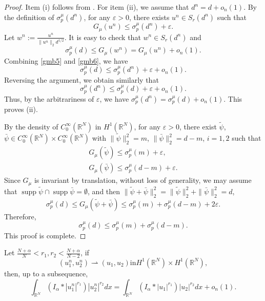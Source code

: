 \documentclass[reqno]{amsart}
\begin{document}
\begin{proof}
Item (i) follows from \cite[Theorem 1.2]{ygg}. 
For item (ii), we assume that $d^n=d+o_n(1)$. By the definition of
$\sigma_p^{\mu}(d^n)$, for any $\varepsilon>0$, there exists $u^n\in
 S_r(d^n)$ such that
\begin{equation}\label{gmb5}
 G_\mu(u^n)\leq\sigma_p^{\mu}(d^n)+\varepsilon.
\end{equation}
Let $w^n:=\frac{u^n}{\| u^n \|_2d^{1/2}}$. It is
easy to check that $w^n\in S_r(d^n)$ and
\begin{equation}\label{gmb6}
 \sigma_p^{\mu}(d)\leq G_\mu(w^n)=G_\mu(u^n)+o_n(1).
\end{equation}
Combining \eqref{gmb5} and \eqref{gmb6}, we have
\[
 \sigma_p^{\mu}(d)\leq\sigma_p^{\mu}(d^n)+\varepsilon+o_n(1).
\]
Reversing the argument, we obtain similarly that
\[
\sigma_p^{\mu}(d^n)\leq\sigma_p^{\mu}(d)+\varepsilon+o_n(1).
\]
Thus, by the arbitrariness of $\varepsilon$, we have
$\sigma_p^{\mu}(d^n)=\sigma_p^{\mu}(d)+o_n(1)$. This proves (ii).

By the density of $C_0^{\infty}(\mathbb{R}^N)$ in $H^1(\mathbb{R}^N)$, 
for any $\varepsilon>0$, there exist $\tilde{\psi}$, $\bar{\psi}
 \in C_0^{\infty}(\mathbb{R}^N)\times C_0^{\infty}(\mathbb{R}^N)$ with 
$\| \tilde{\psi}\|_2^2=m$, $\| \bar{\psi}\|_2^2=d-m$,
$i=1,2$ such that
\begin{gather*}
G_\mu(\tilde{\psi})\leq\sigma_p^{\mu}(m)+\varepsilon,\\
G_\mu(\bar{\psi})\leq\sigma_p^{\mu}(d-m)+\varepsilon.
\end{gather*}
Since $G_\mu$ is invariant by translation, without loss of generality, we may assume 
that $\operatorname{supp}\tilde{\psi}\cap \operatorname{supp}\bar{\psi}=\emptyset$, 
and then
 $\| \tilde{\psi}+\bar{\psi}\|_2^2=\| \tilde{\psi}\|_2^2+\|\bar{\psi}\|_2^2=d$,
\[
 \sigma_p^{\mu}(d)\leq G_\mu(\tilde{\psi}+\bar{\psi})\leq\sigma_p^{\mu}(m)+
 \sigma_p^{\mu}(d-m)+2\varepsilon.
\]
Therefore,
\[
 \sigma_p^{\mu}(d)\leq\sigma_p^{\mu}(m)+\sigma_p^{\mu}(d-m).
\]
This proof is complete.
\end{proof}

\begin{lemma} \label{ph2}
Let $\frac{N+\alpha}{N}<r_1,r_2<\frac{N+\alpha}{N-2}$, if
\[
(u_1^n,u_2^n)\rightharpoonup(u_1,u_2) \text{in} H^1(\mathbb{R}^N)\times H^1(\mathbb{R}^N),
\]
then, up to a subsequence,
\begin{equation}\label{Blm}
 \int_{\mathbb{R}^N}(I_\alpha\ast|u_1^n|^{r_1})|u_2^n|^{r_2}dx
 =\int_{\mathbb{R}^N}(I_\alpha\ast|u_1|^{r_1})|u_2|^{r_2}dx+o_n(1).
\end{equation}
\end{lemma}
\end{document}
